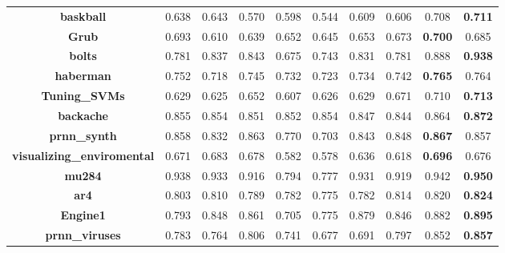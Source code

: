 \documentclass[a4paper,12pt]{article}
\begin{document}
\begin{table*}[htb]
\begin{tabular}{cccccccccc}
\textbf{baskball}         & 0.638        & 0.643          & 0.570        & 0.598        & 0.544              & 0.609          & 0.606          & 0.708            & \textbf{0.711} \\
\textbf{Grub}      & 0.693        & 0.610          & 0.639        & 0.652        & 0.645              & 0.653          & 0.673          & \textbf{0.700}   & 0.685          \\
\textbf{bolts}            & 0.781        & 0.837          & 0.843        & 0.675        & 0.743              & 0.831          & 0.781          & 0.888            & \textbf{0.938} \\
\textbf{haberman}         & 0.752        & 0.718          & 0.745        & 0.732        & 0.723              & 0.734          & 0.742          & \textbf{0.765}   & 0.764          \\
\textbf{Tuning\_SVMs}       & 0.629        & 0.625          & 0.652        & 0.607        & 0.626              & 0.629          & 0.671          & 0.710            & \textbf{0.713} \\
\textbf{backache}         & 0.855        & 0.854          & 0.851        & 0.852        & 0.854              & 0.847          & 0.844          & 0.864            & \textbf{0.872} \\
\textbf{prnn\_synth}      & 0.858        & 0.832          & 0.863        & 0.770        & 0.703              & 0.843          & 0.848          & \textbf{0.867}   & 0.857          \\
\textbf{visualizing\_enviromental}     & 0.671        & 0.683          & 0.678        & 0.582        & 0.578              & 0.636          & 0.618          & \textbf{0.696}   & 0.676          \\
\textbf{mu284}            & 0.938        & 0.933          & 0.916        & 0.794        & 0.777              & 0.931          & 0.919          & 0.942            & \textbf{0.950} \\
\textbf{ar4}              & 0.803        & 0.810          & 0.789        & 0.782        & 0.775              & 0.782          & 0.814          & 0.820            & \textbf{0.824} \\
\textbf{Engine1}          & 0.793        & 0.848          & 0.861        & 0.705        & 0.775              & 0.879          & 0.846          & 0.882            & \textbf{0.895} \\
\textbf{prnn\_viruses}    & 0.783        & 0.764          & 0.806        & 0.741        & 0.677              & 0.691          & 0.797          & 0.852            & \textbf{0.857} \\

\end{tabular}
\end{table*}
\end{document}
